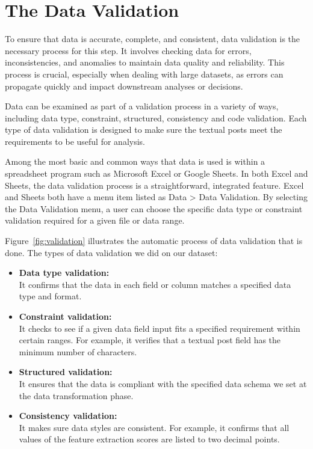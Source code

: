 \section{The Data Validation}
To ensure that data is accurate, complete, and consistent, data validation is the necessary process for this step. It involves checking data for errors, inconsistencies, and anomalies to maintain data quality and reliability. This process is crucial, especially when dealing with large datasets, as errors can propagate quickly and impact downstream analyses or decisions.

Data can be examined as part of a validation process in a variety of ways, including data type, constraint, structured, consistency and code validation. Each type of data validation is designed to make sure the textual posts meet the requirements to be useful for analysis.

Among the most basic and common ways that data is used is within a spreadsheet program such as Microsoft Excel or Google Sheets. In both Excel and Sheets, the data validation process is a straightforward, integrated feature. Excel and Sheets both have a menu item listed as Data > Data Validation. By selecting the Data Validation menu, a user can choose the specific data type or constraint validation required for a given file or data range.

Figure~\ref{fig:validation} illustrates the automatic process of data validation that is done. The types of data validation we did on our dataset:
\begin{itemize}
\item \textbf{Data type validation:}\\ It confirms that the data in each field or column matches a specified data type and format.
\item \textbf{Constraint validation:}\\
It checks to see if a given data field input fits a specified requirement within certain ranges. For example, it verifies that a textual post field has the minimum number of characters.
\item \textbf{Structured validation:}\\
It ensures that the data is compliant with the specified data schema we set at the data transformation phase.
\item \textbf{Consistency validation:}\\
It makes sure data styles are consistent. For example, it confirms that all values of the feature extraction scores are listed to two decimal points.
\end{itemize}

